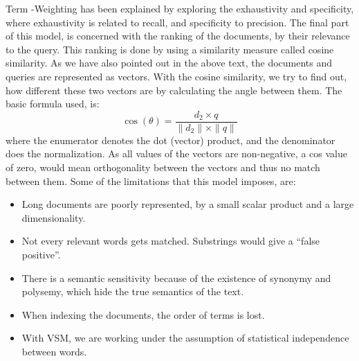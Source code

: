 Term -Weighting  has been explained by exploring the exhaustivity and specificity, where exhaustivity is related to recall, and specificity to precision. 
The final part of this model, is concerned with the ranking of the documents, by their relevance to the query. This ranking is done by using a similarity measure called cosine similarity. As we have also pointed out in the above text, the documents and queries are represented as vectors. With the cosine similarity, we try to find out, how different these two vectors are by calculating the angle between them. The basic formula used, is:
\[
\cos(\theta) = \frac{d_2 \times q}{\parallel d_2 \parallel \times \parallel q \parallel}
\]
where the enumerator denotes the dot (vector) product, and the denominator does the normalization. As all values of the vectors are non-negative, a cos value of zero, would mean orthogonality between the vectors and thus no match between them. 
Some of the limitations that this model imposes, are:
\begin{itemize}
\item{Long documents are poorly represented, by a small scalar product and a large dimensionality.}
\item{Not every relevant words gets matched. Substrings would give a “false positive”.}
\item{There is a semantic sensitivity because of the existence of synonymy and polysemy, which hide the true semantics of the text.}
\item{When indexing the documents, the order of terms is lost.}
\item{With VSM, we are working under the assumption of statistical independence between words.}
\end{itemize}

